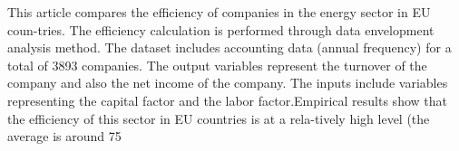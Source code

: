 
\begin{Abstrakt}
    This article compares the efficiency of companies in the energy sector in EU coun-tries. The efficiency calculation is performed through data envelopment analysis method. The dataset includes accounting data (annual frequency) for a total of 3893 companies. The output variables represent the turnover of the company and also the net income of the company. The inputs include variables representing the capital factor and the labor factor.\newline Empirical results show that the efficiency of this sector in EU countries is at a rela-tively high level (the average is around 75%
\end{Abstrakt}



\clearpage